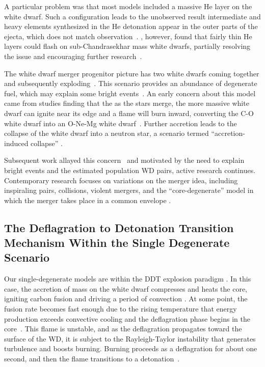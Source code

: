 \documentclass[iop,apj]{emulateapj}
\begin{document}
A particular problem was that most models included a massive He layer on 
the white dwarf. Such a configuration leads to the unobserved result 
intermediate and heavy elements synthesized in the He detonation appear in 
the outer parts of the ejecta, which does not match observation~\citep{HoefKhok96,
hoeflichetal96,finkhillebrandtroepke2007,simetal2010}.  \citet{bildstenetal2007}, 
however, found that fairly thin He layers could flash on sub-Chandrasekhar
mass white dwarfs, partially resolving the issue and encouraging
further research~\citep{simetal2012,brooksetal2015, shenetal2018,
glasneretal2018}.

The white dwarf merger progenitor picture has two white dwarfs coming 
together and subsequently exploding~\citep{tutukovyungelson76,tutukovyungelson79,
webbink84,ibentutukov84}. This scenario provides an abundance of degenerate fuel, 
which may explain some bright events~\citep{scalzo:2010,Yuan:2010}. 
An early concern about this model came from studies finding that 
the as the stars merge, the more massive white dwarf can ignite near
its edge and a flame will burn inward, converting the C-O white dwarf into 
an O-Ne-Mg white dwarf~\citep{saionomoto1985,saionomoto2004}.  Further accretion 
leads to the collapse of the white dwarf
into a neutron star, a scenario termed ``accretion-induced collapse''
\citep{nomotokondo1991}.

Subsequent work allayed this concern~\citep{yoonetal2007,lorenaguilaretal2009,
Shenetal12, pakmoretal2012b} and motivated by the need to explain bright events
and the estimated population WD pairs, active research continues. Contemporary
research focuses on variations on the merger idea, including inspiraling pairs, 
collisions, violent mergers, and the ``core-degenerate'' model in which the merger 
takes place in a common envelope \citep{raskinetal2009,pakmoretal2011,kashi:2011,
pakmoretal2012a,Shenetal12,katzetal2016}.


\subsection{The Deflagration to Detonation Transition Mechanism Within 
the Single Degenerate Scenario}

Our single-degenerate models are within the DDT explosion paradigm \cite{1986SvAL,
Khokhlov1991Delayed-detonat,NiemWoos97,Niem99,belletal2004,fishjump2015}. 
In this case, the accretion of mass on the white dwarf compresses and 
heats the core, igniting carbon fusion and driving a period of convection
\citep{WoosWunsKuhl04,wunschwoosley2004,Kuhletal06,nonakaetal2012}.
At some point, the fusion rate becomes fast enough due to the rising
temperature that energy production exceeds convective cooling and
the deflagration phase begins in the core~\citep{Nomo84,WoosWunsKuhl04}.
This flame is unstable, and as the deflagration propagates toward the surface
of the WD, it is subject to the Rayleigh-Taylor instability that generates
turbulence and boosts burning.  
Burning proceeds as a deflagration for about one second, and then 
the flame transitions to a detonation~\citep{hoflich.khokhlov.ea:delayed}. 
\end{document}

